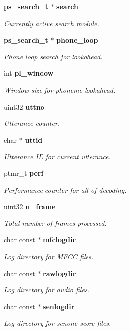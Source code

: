\begin{DoxyCompactItemize}
{\bf ps\-\_\-search\-\_\-t} $\ast$ {\bf search}
\begin{DoxyCompactList}\small\item\em Currently active search module. \end{DoxyCompactList}\item 
{\bf ps\-\_\-search\-\_\-t} $\ast$ {\bf phone\-\_\-loop}
\begin{DoxyCompactList}\small\item\em Phone loop search for lookahead. \end{DoxyCompactList}\item 
int {\bf pl\-\_\-window}
\begin{DoxyCompactList}\small\item\em Window size for phoneme lookahead. \end{DoxyCompactList}\item 
uint32 {\bf uttno}
\begin{DoxyCompactList}\small\item\em Utterance counter. \end{DoxyCompactList}\item 
char $\ast$ {\bf uttid}
\begin{DoxyCompactList}\small\item\em Utterance I\-D for current utterance. \end{DoxyCompactList}\item 
ptmr\-\_\-t {\bf perf}
\begin{DoxyCompactList}\small\item\em Performance counter for all of decoding. \end{DoxyCompactList}\item 
uint32 {\bf n\-\_\-frame}
\begin{DoxyCompactList}\small\item\em Total number of frames processed. \end{DoxyCompactList}\item 
char const $\ast$ {\bf mfclogdir}
\begin{DoxyCompactList}\small\item\em Log directory for M\-F\-C\-C files. \end{DoxyCompactList}\item 
char const $\ast$ {\bf rawlogdir}
\begin{DoxyCompactList}\small\item\em Log directory for audio files. \end{DoxyCompactList}\item 
char const $\ast$ {\bf senlogdir}
\begin{DoxyCompactList}\small\item\em Log directory for senone score files. \end{DoxyCompactList}\end{DoxyCompactItemize}


